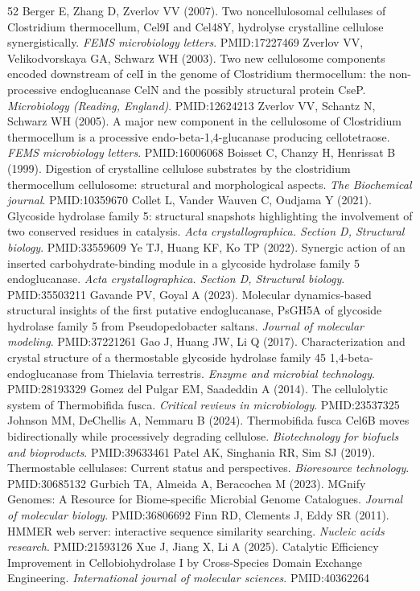 \documentclass[11pt]{article}
\begin{document}
\begin{thebibliography}{52}
 Berger E, Zhang D, Zverlov VV (2007). Two noncellulosomal cellulases of Clostridium thermocellum, Cel9I and Cel48Y, hydrolyse crystalline cellulose synergistically. \textit{FEMS microbiology letters}. PMID:17227469
 Zverlov VV, Velikodvorskaya GA, Schwarz WH (2003). Two new cellulosome components encoded downstream of celI in the genome of Clostridium thermocellum: the non-processive endoglucanase CelN and the possibly structural protein CseP. \textit{Microbiology (Reading, England)}. PMID:12624213
 Zverlov VV, Schantz N, Schwarz WH (2005). A major new component in the cellulosome of Clostridium thermocellum is a processive endo-beta-1,4-glucanase producing cellotetraose. \textit{FEMS microbiology letters}. PMID:16006068
 Boisset C, Chanzy H, Henrissat B (1999). Digestion of crystalline cellulose substrates by the clostridium thermocellum cellulosome: structural and morphological aspects. \textit{The Biochemical journal}. PMID:10359670
 Collet L, Vander Wauven C, Oudjama Y (2021). Glycoside hydrolase family 5: structural snapshots highlighting the involvement of two conserved residues in catalysis. \textit{Acta crystallographica. Section D, Structural biology}. PMID:33559609
 Ye TJ, Huang KF, Ko TP (2022). Synergic action of an inserted carbohydrate-binding module in a glycoside hydrolase family 5 endoglucanase. \textit{Acta crystallographica. Section D, Structural biology}. PMID:35503211
 Gavande PV, Goyal A (2023). Molecular dynamics-based structural insights of the first putative endoglucanase, PsGH5A of glycoside hydrolase family 5 from Pseudopedobacter saltans. \textit{Journal of molecular modeling}. PMID:37221261
 Gao J, Huang JW, Li Q (2017). Characterization and crystal structure of a thermostable glycoside hydrolase family 45 1,4-beta-endoglucanase from Thielavia terrestris. \textit{Enzyme and microbial technology}. PMID:28193329
 Gomez del Pulgar EM, Saadeddin A (2014). The cellulolytic system of Thermobifida fusca. \textit{Critical reviews in microbiology}. PMID:23537325
 Johnson MM, DeChellis A, Nemmaru B (2024). Thermobifida fusca Cel6B moves bidirectionally while processively degrading cellulose. \textit{Biotechnology for biofuels and bioproducts}. PMID:39633461
 Patel AK, Singhania RR, Sim SJ (2019). Thermostable cellulases: Current status and perspectives. \textit{Bioresource technology}. PMID:30685132
 Gurbich TA, Almeida A, Beracochea M (2023). MGnify Genomes: A Resource for Biome-specific Microbial Genome Catalogues. \textit{Journal of molecular biology}. PMID:36806692
 Finn RD, Clements J, Eddy SR (2011). HMMER web server: interactive sequence similarity searching. \textit{Nucleic acids research}. PMID:21593126
 Xue J, Jiang X, Li A (2025). Catalytic Efficiency Improvement in Cellobiohydrolase I by Cross-Species Domain Exchange Engineering. \textit{International journal of molecular sciences}. PMID:40362264
\end{thebibliography}
\end{document}
